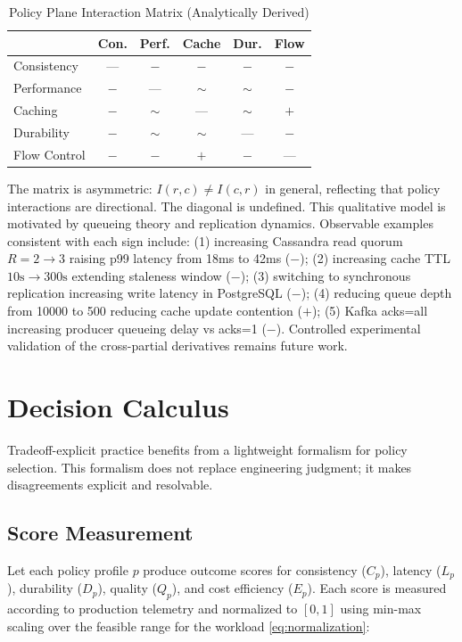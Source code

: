\documentclass[conference]{IEEEtran}
\begin{document}
\begin{table}[t]

\caption{Policy Plane Interaction Matrix (Analytically Derived)}
\label{tab:interactions}
\centering
\small
\begin{tabular}{@{}l c c c c c@{}}
\toprule
& Con. & Perf. & Cache & Dur. & Flow \\
\midrule
Consistency & --- & $-$ & $-$ & $-$ & $-$ \\
Performance & $-$ & --- & $\sim$ & $\sim$ & $-$ \\
Caching & $-$ & $\sim$ & --- & $\sim$ & $+$ \\
Durability & $-$ & $\sim$ & $\sim$ & --- & $-$ \\
Flow Control & $-$ & $-$ & $+$ & $-$ & --- \\
\bottomrule
\end{tabular}
\end{table}


The matrix is asymmetric: $I(r,c) \neq I(c,r)$ in general, reflecting that policy interactions are directional. The diagonal is undefined. This qualitative model is motivated by queueing theory and replication dynamics. Observable examples consistent with each sign include: (1) increasing Cassandra read quorum $R=2\to3$ raising p99 latency from 18ms to 42ms ($-$); (2) increasing cache TTL $10\text{s}\to300\text{s}$ extending staleness window ($-$); (3) switching to synchronous replication increasing write latency in PostgreSQL ($-$); (4) reducing queue depth from 10000 to 500 reducing cache update contention ($+$); (5) Kafka acks=all increasing producer queueing delay vs acks=1 ($-$). Controlled experimental validation of the cross-partial derivatives remains future work.

\section{Decision Calculus}
\label{sec:calculus}

Tradeoff-explicit practice benefits from a lightweight formalism for policy selection. This formalism does not replace engineering judgment; it makes disagreements explicit and resolvable.

\subsection{Score Measurement}

Let each policy profile $p$ produce outcome scores for consistency ($C_p$), latency ($L_p$), durability ($D_p$), quality ($Q_p$), and cost efficiency ($E_p$). Each score is measured according to production telemetry and normalized to $[0, 1]$ using min-max scaling over the feasible range for the workload \eqref{eq:normalization}:
\end{document}
